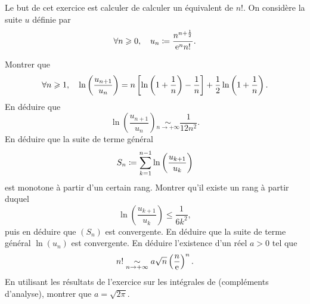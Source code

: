 \documentclass{magnolia}
\begin{document}
Le but de cet exercice est calculer de calculer un équivalent de $n!$.
On considère la suite $u$ définie par
$$\forall n \geqslant 0 ,\quad u_n\coloneqq\frac{n^{n+\frac{1}{2}}}{{\rm e}^n n!}.$$
\begin{questions}
\question Montrer que
  $$\forall n \geqslant 1 ,\quad \ln\left(\frac{u_{n+1}}{u_n}\right)=
    n\left[\ln\left(1+\frac{1}{n}\right)-\frac{1}{n}\right]+
    \frac{1}{2}\ln\left(1+\frac{1}{n}\right).$$
\question En déduire que
  $$\ln\left(\frac{u_{n+1}}{u_n}\right)
    \underset{n\rightarrow +\infty}{\sim}\frac{1}{12n^2}.$$
\question En déduire que la suite de terme général
  \[S_n\coloneqq\sum_{k=1}^{n-1} \ln\left(\frac{u_{k+1}}{u_k}\right)\]
  est monotone à partir d'un certain
  rang. Montrer qu'il existe un rang à partir duquel
  \[\ln\left(\frac{u_{k+1}}{u_k}\right)\leq\frac{1}{6k^2},\]
  puis en déduire que $(S_n)$ est convergente.
\question En déduire que la suite de terme général $\ln(u_n)$ est convergente.
\question En déduire l'existence d'un réel $a>0$ tel que 
  $$n!\underset{n\rightarrow+\infty}{\sim}a\sqrt{n}\left(\frac{n}{{\rm e}}\right)^n.$$
\question En utilisant les résultats de l'exercice sur les intégrales de 
  (compléments d'analyse), montrer que $a=\sqrt{2\pi}$.
\end{questions}
\end{document}
